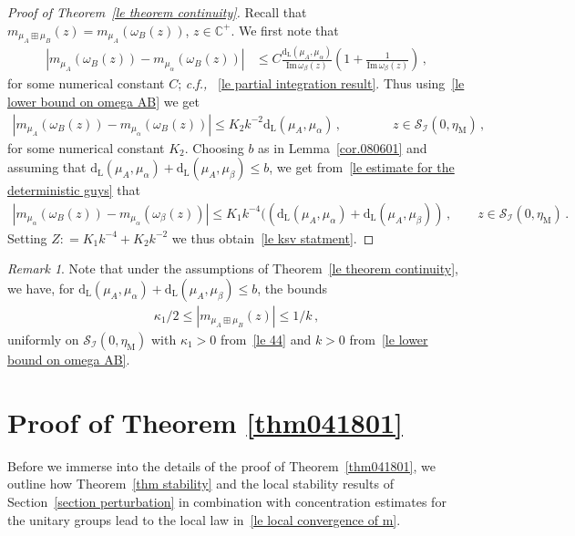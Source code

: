 \documentclass[10pt,reqno]{amsart}
\numberwithin{equation}{section}
\theoremstyle{plain}
\newcounter{kevin}
\numberwithin{kevin}{section}
\theoremstyle{remark}
\newtheorem{remark}[kevin]{Remark}
\newcommand{\im}{\mathrm{Im}\,}
\newcommand{\C}{{\mathbb C}}
\newcommand{\deq}{\mathrel{\mathop:}=}
\newcommand{\cf}{\emph{c.f., }}
\newcommand{\dL}{\mathrm{d}_{\mathrm{L}}}
\begin{document}
 
 \begin{proof}[Proof of Theorem~\ref{le theorem continuity}]
 Recall that $m_{\mu_A\boxplus \mu_B}(z)=m_{\mu_A}(\omega_B(z))$, $z\in\C^+$. We first note that 
 \begin{align*}
|m_{\mu_A}(\omega_B(z))-m_{\mu_\alpha}(\omega_B(z))|&\le C\frac{\dL(\mu_A,\mu_\alpha)}{\im \omega_\beta(z)}\left(1+\frac{1}{\im \omega_\beta(z)}\right)\,,
\end{align*}
for some numerical constant $C$; \cf~\eqref{le partial integration result}. Thus using~\eqref{le lower bound on omega AB} we get
\begin{align*}
|m_{\mu_A}(\omega_B(z))-m_{\mu_\alpha}(\omega_B(z))|\le K_2 k^{-2} \dL(\mu_A,\mu_\alpha)\,,\qquad\qquad z\in\mathcal{S}_{\mathcal{I}}(0,\eta_{\mathrm{M}})\,,
 \end{align*}
for some numerical constant $K_2$. Choosing $b$ as in Lemma~\ref{cor.080601} and assuming that $\dL(\mu_A,\mu_\alpha)+\dL(\mu_A,\mu_\beta)\le b$,  we get from~\eqref{le estimate for the deterministic guys} that
\begin{align*}
|m_{\mu_\alpha}(\omega_B(z))-m_{\mu_\alpha}(\omega_\beta(z))|\le K_1k^{-4}((\dL(\mu_A,\mu_\alpha)+\dL(\mu_A,\mu_\beta)) \,, \qquad z\in\mathcal{S}_{\mathcal{I}}(0,\eta_{\mathrm{M}})\,.
 \end{align*}
 Setting $Z\deq K_1k^{-4}+K_2k^{-2}$ we thus obtain~\eqref{le ksv statment}.
\qedhere\end{proof}
 \begin{remark}\label{la cor bound on mAB}
Note that under the assumptions of Theorem~\ref{le theorem continuity}, we have, for $\dL(\mu_A,\mu_\alpha)+\dL(\mu_A,\mu_\beta)\le b$, the bounds
 \begin{align}\label{le bound on mAB stuff}
  \kappa_1/2\le|m_{\mu_A\boxplus\mu_B}(z)|\le 1/k\,,
\end{align}
uniformly on $\mathcal{S}_{\mathcal{I}}(0,\eta_{\mathrm{M}})$ with $\kappa_1>0$ from~\eqref{le 44} and $k>0$ from~\eqref{le lower bound on omega AB}. 
 \end{remark}

  
  
\section{Proof of Theorem \ref{thm041801}}\label{le section proof of theorem matrix}
 Before we immerse into the details of the proof of Theorem~\ref{thm041801}, we outline how Theorem~\ref{thm stability} and the local stability results of Section~\ref{section perturbation} in combination with concentration estimates for the unitary groups lead to the local law in~\eqref{le local convergence of m}.
 
\end{document}
